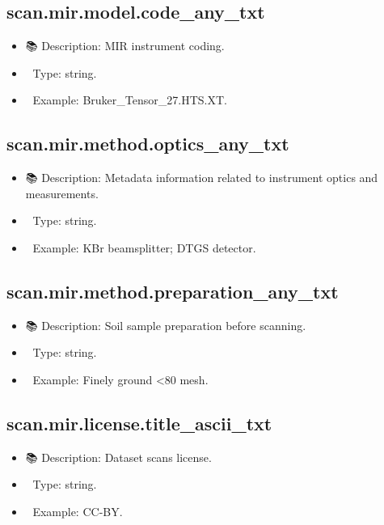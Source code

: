 \documentclass[
  letterpaper,
  DIV=11,
  numbers=noendperiod]{scrreprt}
\providecommand{\tightlist}{%
  \setlength{\itemsep}{0pt}\setlength{\parskip}{0pt}}\usepackage{longtable,booktabs,array}
\begin{document}
\subsection{scan.mir.model.code\_any\_txt}\label{scan.mir.model.code_any_txt}

\begin{itemize}
\tightlist
\item
  📚 Description: MIR instrument coding.
\item
  🔢 Type: string.
\item
  📖 Example: Bruker\_Tensor\_27.HTS.XT.
\end{itemize}

\subsection{scan.mir.method.optics\_any\_txt}\label{scan.mir.method.optics_any_txt}

\begin{itemize}
\tightlist
\item
  📚 Description: Metadata information related to instrument optics and
  measurements.
\item
  🔢 Type: string.
\item
  📖 Example: KBr beamsplitter; DTGS detector.
\end{itemize}

\subsection{scan.mir.method.preparation\_any\_txt}\label{scan.mir.method.preparation_any_txt}

\begin{itemize}
\tightlist
\item
  📚 Description: Soil sample preparation before scanning.
\item
  🔢 Type: string.
\item
  📖 Example: Finely ground \textless80 mesh.
\end{itemize}

\subsection{scan.mir.license.title\_ascii\_txt}\label{scan.mir.license.title_ascii_txt}

\begin{itemize}
\tightlist
\item
  📚 Description: Dataset scans license.
\item
  🔢 Type: string.
\item
  📖 Example: CC-BY.
\end{itemize}
\end{document}
